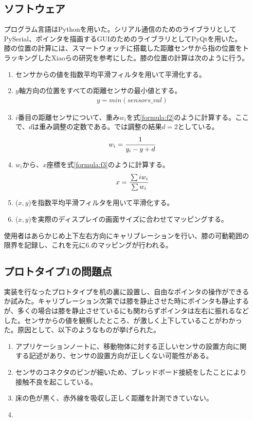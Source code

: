 \subsection{ソフトウェア} 
プログラム言語はPythonを用いた。シリアル通信のためのライブラリとしてPySerial、ポインタを描画するGUIのためのライブラリとしてPyQtを用いた。
膝の位置の計算には、スマートウォッチに搭載した距離センサから指の位置をトラッキングしたXiaoら\cite{Xiao:2018:LOP:3173574.3173669}の研究を参考にした。膝の位置の計算は次のように行う。
\begin{enumerate}
	\item センサからの値を指数平均平滑フィルタを用いて平滑化する。
	\item $y$軸方向の位置をすべての距離センサの最小値とする。
		\begin{eqnarray}
		 	y = min(sensors\_val)
		 	\label{formula:f1}
		\end{eqnarray}
	\item $i$番目の距離センサについて、重み$w_i$を式\ref{formula:f2}のように計算する。ここで、$d$は重み調整の定数である。\SysName では調整の結果$d=2$としている。
		\begin{eqnarray}
			w_i = \cfrac{1}{y_i - y + d}
		\label{formula:f2}
	\end{eqnarray}
	\item $w_i$から、$x$座標を式\ref{formula:f3}のように計算する。
		\begin{eqnarray}
		 	x =\cfrac{\sum iw_i}{\sum w_i}
		 	\label{formula:f3}
		\end{eqnarray} 
	\item ($x,y$)を指数平均平滑フィルタを用いて平滑化する。
	\item ($x,y$)を実際のディスプレイの画面サイズに合わせてマッピングする。
\end{enumerate}
使用者はあらかじめ上下左右方向にキャリブレーションを行い、膝の可動範囲の限界を記録し、これを元に6.のマッピングが行われる。

\subsection{プロトタイプ1の問題点}
実装を行なったプロトタイプを机の裏に設置し、自由なポインタの操作ができるか試みた。キャリブレーション次第では膝を静止させた時にポインタも静止するが、多くの場合は膝を静止させているにも関わらずポインタは左右に振れるなどした。センサからの値を観察したところ、が激しく上下していることがわかった。原因として、以下のようなものが挙げられた。
\begin{enumerate}
	\item アプリケーションノートに、移動物体に対する正しいセンサの設置方向に関する記述があり、センサの設置方向が正しくない可能性がある。
	\item センサのコネクタのピンが細いため、ブレッドボード接続をしたことにより接触不良を起こしている。
	\item 床の色が黒く、赤外線を吸収し正しく距離を計測できていない。
	\item {}
\end{enumerate}

